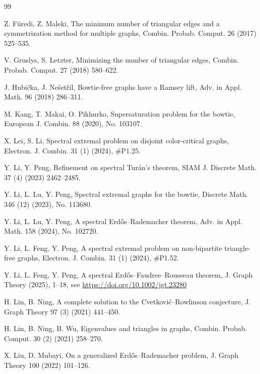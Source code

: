 \documentclass[11pt]{article}
\begin{document}
\begin{thebibliography}{99}

Z. F\"{u}redi, Z. Maleki, 
The minimum number of triangular edges and a symmetrization
method for multiple graphs, 
Combin. Probab.  Comput. 26 (2017)  525--535.  


V. Gruslys, S. Letzter, 
Minimizing the number of triangular edges, 
Combin. Probab.  Comput. 27 (2018) 580--622. 


J. Hubi\v{c}ka, J. Ne\v{s}et\v{r}il,
Bowtie-free graphs have a Ramsey lift,
Adv. in Appl. Math. 96 (2018) 286--311.

M. Kang, T. Makai, O. Pikhurko,
Supersaturation problem for the bowtie,
European J. Combin. 88 (2020), No. 103107. 


X. Lei, S. Li, Spectral extremal problem on disjoint color-critical graphs, Electron. J. Combin. 31 (1) (2024), \#P1.25.


 Y. Li, Y. Peng, 
 Refinement on  spectral Tur\'{a}n's theorem, 
 SIAM J. Discrete Math. 37 (4) (2023) 2462--2485.  
 
Y. Li, L. Lu, Y. Peng,
Spectral extremal graphs for the bowtie,
  Discrete Math. 346 (12) (2023), No. 113680. 
  
Y. Li, L. Lu, Y. Peng, 
A spectral Erd\H{o}s--Rademacher theorem, 
Adv. in Appl. Math. 158 (2024), No. 102720.   

Y. Li, L. Feng, Y. Peng, 
A spectral extremal problem on non-bipartite triangle-free graphs, 
Electron. J. Combin. 31 (1) (2024), \#P1.52. 

Y. Li, L. Feng, Y. Peng, 
A spectral Erd\H{o}s--Faudree--Rousseau theorem, 
J. Graph Theory (2025), 1--18, see \url{https://doi.org/10.1002/jgt.23280} 

H. Lin,  B. Ning, 
A complete solution to the Cvetkovi\'{c}--Rowlinson conjecture, 
J. Graph Theory 97 (3) (2021) 441--450.  

H. Lin, B. Ning, B. Wu, 
Eigenvalues and triangles in graphs, 
Combin. Probab. Comput. 30 (2) (2021) 258--270.  



X. Liu, D. Mubayi, 
On a generalized Erd\H{o}s--Rademacher problem, 
J. Graph Theory 100 (2022) 101--126. 


\end{thebibliography}
\end{document}

